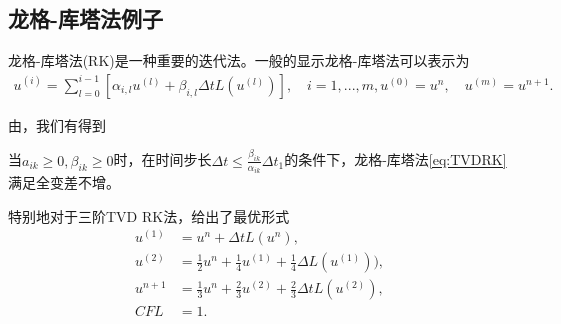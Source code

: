 \subsection{龙格-库塔法例子}
龙格-库塔法(RK)是一种重要的迭代法。一般的显示龙格-库塔法可以表示为
\begin{equation}
    \begin{aligned}
        u^{(i)} = \sum_{l=0}^{i-1}[\alpha_{i,l}u^{(l)} + \beta_{i,l}\Delta tL(u^{(l)})], \quad i = 1,...,m,
        u^{(0)}=u^n,\quad u^{(m)} = u^{n+1}.
    \end{aligned}
    \label{eq:TVDRK}
\end{equation}

由\parencite{shu1998total}，我们有得到
\begin{lemma}
    当$a_{ik} \geq 0, \beta_{ik} \geq 0$时，在时间步长$\Delta t \leq \frac{\beta_{ik}}{\alpha_{ik}} \Delta t_1$的条件下，龙格-库塔法\eqref{eq:TVDRK}满足全变差不增。
\end{lemma}

特别地对于三阶TVD RK法，\parencite{shu1998total}给出了最优形式
\begin{equation}
    \begin{aligned}
        u^{(1)} & = u^n + \Delta t L(u^n),                                                \\
        u^{(2)} & = \frac{1}{2}u^n + \frac{1}{4}u^{(1)} + \frac{1}{4}\Delta L(u^{(1)})),  \\
        u^{n+1} & = \frac{1}{3}u^n + \frac{2}{3}u^{(2)} + \frac{2}{3}\Delta t L(u^{(2)}), \\
        CFL     & = 1.
    \end{aligned}
\end{equation}

